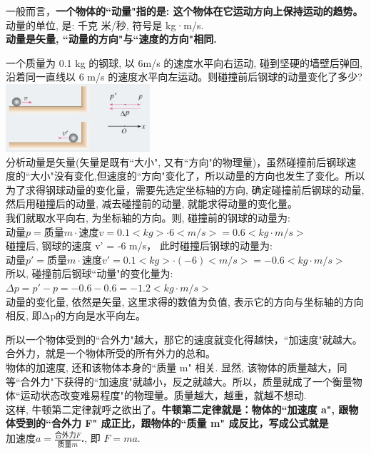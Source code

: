 \documentclass[UTF8]{ctexart}
\begin{document}
一般而言，\textbf{一个物体的``动量"指的是: 这个物体在它运动方向上保持运动的趋势。}\\

动量的单位, 是: 千克 米/秒, 符号是 kg·m/s. \\
\textbf{动量是矢量, ``动量的方向"与``速度的方向"相同.}\\


\begin{myEnvSample}
	一个质量为 0.1 kg 的钢球, 以 6m/s 的速度水平向右运动, 碰到坚硬的墙壁后弹回,沿着同一直线以 6 m/s 的速度水平向左运动。则碰撞前后钢球的动量变化了多少? \\

\includegraphics[width=0.4\textwidth]{img/0104.png} \\	

分析动量是矢量(矢量是既有``大小", 又有``方向"的物理量)，虽然碰撞前后钢球速度的``大小"没有变化,但速度的``方向"变化了，所以动量的方向也发生了变化。所以为了求得钢球动量的变化量，需要先选定坐标轴的方向, 确定碰撞前后钢球的动量, 然后用碰撞后的动量, 减去碰撞前的动量, 就能求得动量的变化量。\\

我们就取水平向右, 为坐标轴的方向。则, 碰撞前的钢球的动量为: \\
$\text{动量}p=\text{质量}m\cdot \text{速度}v=0.1<kg>\cdot 6<m/s>=0.6<kg·m/s>	$ \\

碰撞后, 钢球的速度 v' = -6 m/s， 此时碰撞后钢球的动量为: \\
$\text{动量}p'=\text{质量}m\cdot \text{速度}v'=0.1<kg>\cdot (-6)<m/s>= -0.6<kg·m/s>	$ \\

所以, 碰撞前后钢球``动量"的变化量为: \\
$\varDelta p=p'-p=-0.6-0.6=-1.2<kg·m/s>$ \\

动量的变化量, 依然是矢量, 这里求得的数值为负值, 表示它的方向与坐标轴的方向相反, 即Δp的方向是水平向左。	
\end{myEnvSample}


所以一个物体受到的``合外力"越大，那它的速度就变化得越快，``加速度"就越大。 合外力，就是一个物体所受的所有外力的总和。 \\
物体的加速度, 还和该物体本身的``质量 m" 相关. 显然, 该物体的质量越大，同等``合外力"下获得的``加速度"就越小，反之就越大。所以，质量就成了一个衡量物体``运动状态改变难易程度"的物理量。质量越大，越重，就越不想动.\\
这样, 牛顿第二定律就呼之欲出了。\textbf{牛顿第二定律就是：物体的``加速度 a",  跟物体受到的``合外力 F" 成正比，跟物体的``质量 m" 成反比，写成公式就是 $\text{加速度}a=\frac{\text{合外力}F}{\text{质量}m}$.}, 即 $F=ma$. \\
\end{document}
